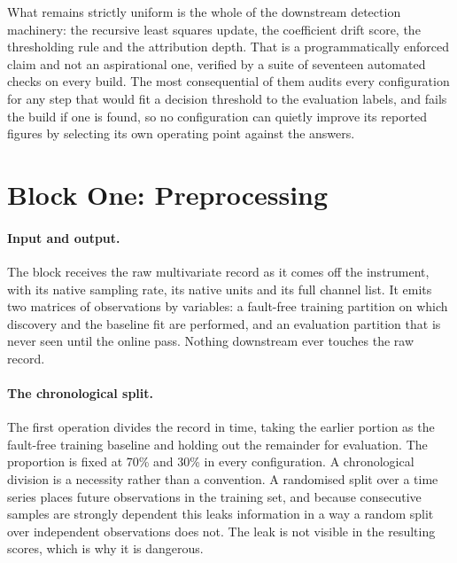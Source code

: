 What remains strictly uniform is the whole of the downstream detection machinery: the recursive least squares update, the coefficient drift score, the thresholding rule and the attribution depth. That is a programmatically enforced claim and not an aspirational one, verified by a suite of seventeen automated checks on every build. The most consequential of them audits every configuration for any step that would fit a decision threshold to the evaluation labels, and fails the build if one is found, so no configuration can quietly improve its reported figures by selecting its own operating point against the answers.

\section{Block One: Preprocessing}
\label{sec:method-preprocessing}

\paragraph{Input and output.} The block receives the raw multivariate record as it comes off the instrument, with its native sampling rate, its native units and its full channel list. It emits two matrices of observations by variables: a fault-free training partition on which discovery and the baseline fit are performed, and an evaluation partition that is never seen until the online pass. Nothing downstream ever touches the raw record.

\paragraph{The chronological split.} The first operation divides the record in time, taking the earlier portion as the fault-free training baseline and holding out the remainder for evaluation. The proportion is fixed at 70\% and 30\% in every configuration. A chronological division is a necessity rather than a convention. A randomised split over a time series places future observations in the training set, and because consecutive samples are strongly dependent this leaks information in a way a random split over independent observations does not. The leak is not visible in the resulting scores, which is why it is dangerous.

